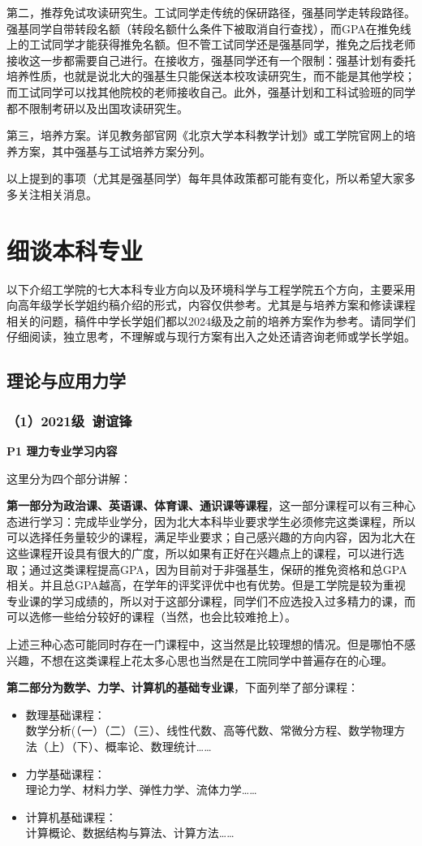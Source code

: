 \documentclass[11pt,oneside]{book}
\begin{document}
第二，推荐免试攻读研究生。工试同学走传统的保研路径，强基同学走转段路径。强基同学自带转段名额（转段名额什么条件下被取消自行查找），而GPA在推免线上的工试同学才能获得推免名额。但不管工试同学还是强基同学，推免之后找老师接收这一步都需要自己进行。在接收方，强基同学还有一个限制：强基计划有委托培养性质，也就是说北大的强基生只能保送本校攻读研究生，而不能是其他学校；而工试同学可以找其他院校的老师接收自己。此外，强基计划和工科试验班的同学都不限制考研以及出国攻读研究生。

第三，培养方案。详见教务部官网《北京大学本科教学计划》或工学院官网上的培养方案，其中强基与工试培养方案分列。

以上提到的事项（尤其是强基同学）每年具体政策都可能有变化，所以希望大家多多关注相关消息。

 
\section{细谈本科专业}
以下介绍工学院的七大本科专业方向以及环境科学与工程学院五个方向，主要采用向高年级学长学姐约稿介绍的形式，内容仅供参考。尤其是与培养方案和修读课程相关的问题，稿件中学长学姐们都以2024级及之前的培养方案作为参考。请同学们仔细阅读，独立思考，不理解或与现行方案有出入之处还请咨询老师或学长学姐。
\subsection{理论与应用力学}
\subsubsection{（1）2021级\ 谢谊锋}
\textbf{P1 理力专业学习内容}

这里分为四个部分讲解：

\textbf{第一部分为政治课、英语课、体育课、通识课等课程}，这一部分课程可以有三种心态进行学习：完成毕业学分，因为北大本科毕业要求学生必须修完这类课程，所以可以选择任务量较少的课程，满足毕业要求；自己感兴趣的方向内容，因为北大在这些课程开设具有很大的广度，所以如果有正好在兴趣点上的课程，可以进行选取；通过这类课程提高GPA，因为目前对于非强基生，保研的推免资格和总GPA相关。并且总GPA越高，在学年的评奖评优中也有优势。但是工学院是较为重视专业课的学习成绩的，所以对于这部分课程，同学们不应选投入过多精力的课，而可以选修一些给分较好的课程（当然，也会比较难抢上）。

上述三种心态可能同时存在一门课程中，这当然是比较理想的情况。但是哪怕不感兴趣，不想在这类课程上花太多心思也当然是在工院同学中普遍存在的心理。
 
\textbf{第二部分为数学、力学、计算机的基础专业课}，下面列举了部分课程：
\begin{itemize}
    \item 数理基础课程：\\数学分析(（一）（二）（三）、线性代数、高等代数、常微分方程、数学物理方法（上）（下）、概率论、数理统计……
    \item 力学基础课程：\\理论力学、材料力学、弹性力学、流体力学……
    \item 计算机基础课程：\\计算概论、数据结构与算法、计算方法……
\end{itemize}
\end{document}
